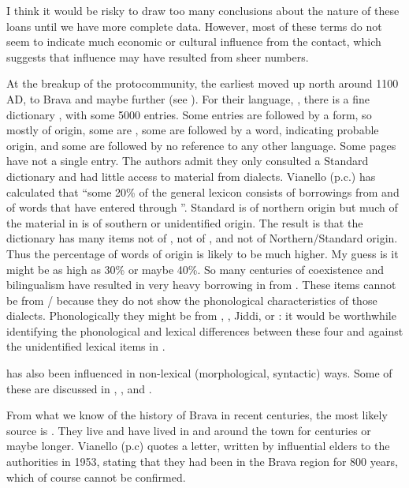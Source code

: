 \documentclass[output=paper,newtxmath,modfonts,nonflat,hidelinks]{langsci/langscibook}
\begin{document}
  I think it would be risky to draw too many conclusions about the nature of these loans until we have more complete data. However, most of these terms do not seem to indicate much economic or cultural influence from the  contact, which suggests that  influence may have resulted from sheer numbers. 

  At the breakup of the protocommunity, the earliest  moved up north around 1100 AD, to Brava and maybe further (see ). For their language, , there is a fine dictionary \citep{Kisseberth2004}, with some 5000 entries. Some entries are followed by a  form, so mostly of  origin, some are , some are followed by a  word, indicating probable  origin, and some are followed by no reference to any other language. Some pages have not a single  entry. The authors admit they only consulted a Standard  dictionary and had little access to material from  dialects. Vianello (p.c.) has calculated that “some 20\% of the general lexicon consists of borrowings from  and of  words that have entered  through ”. Standard  is of northern origin but much of the material in  is of southern or unidentified  origin. The result is that the dictionary has many items not of , not of , and not of Northern/Standard  origin. Thus the percentage of words of  origin is likely to be much higher. My guess is it might be as high as 30\% or maybe 40\%. So many centuries of coexistence and bilingualism have resulted in very heavy borrowing in  from . These items cannot be from / because they do not show the phonological characteristics of those dialects. Phonologically they might be from , , Jiddi, or : it would be worthwhile identifying the phonological and lexical differences between these four and against the unidentified lexical items in . 

   has also been influenced in non-lexical (morphological, syntactic) ways. Some of these are discussed in \citet{nurse1991}, \citet{Henderson2010}, and \citet{Vianello2015}. 

From what we know of the history of Brava in recent centuries, the most likely source is . They live and have lived in and around the town for centuries or maybe longer. Vianello (p.c) quotes a letter, written by influential  elders to the  authorities in 1953, stating that they had been in the Brava region for 800 years, which of course cannot be confirmed. 
\end{document}
